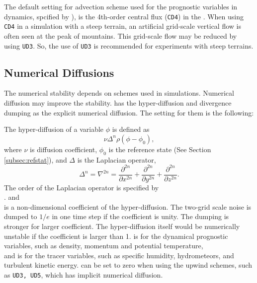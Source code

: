 The default setting for advection scheme used for the prognostic variables in dynamics, spcified by ),
is the 4th-order central flux (\verb|CD4|) in the \scalerm.
When using \verb|CD4| in a simulation with a steep terrain,
an artificial grid-scale vertical flow is often seen at the peak of mountains.
This grid-scale flow may be reduced by using \verb|UD3|.
So, the use of \verb|UD3| is recommended for experiments with steep terrains.


\subsection{Numerical Diffusions} \label{subsec:numdiff}

The numerical stability depends on schemes used in simulations.
Numerical diffusion may improve the stability.
\scalerm has the hyper-diffusion and divergence dumping as the explicit numerical diffusion.
The setting for them is the following:

The hyper-diffusion of a variable $\phi$ is defined as
\begin{equation}
  \nu \Delta^n \rho ( \phi - \phi_0 ),
\end{equation}
where $\nu$ is diffusion coefficient, $\phi_0$ is the reference state (See Section \ref{subsec:refstat}), and $\Delta$ is the Laplacian operator,
\begin{equation}
  \Delta^n = \nabla^{2n} = \frac{\partial^{2n}}{\partial x^{2n}} + \frac{\partial^{2n}}{\partial y^{2n}} + \frac{\partial^{2n}}{\partial z^{2n}}.
\end{equation}
The order of the Laplacian operator is specified by \\
. 
 and \\
 is a non-dimensional coefficient of the hyper-diffusion.
The two-grid scale noise is dumped to $1/e$ in one time step if the coefficient is unity.
The dumping is stronger for larger coefficient.
The hyper-diffusion itself would be numerically unstable if the coefficient is larger than 1.
 is for the dynamical prognostic variables, such as density, momentum and potential temperature, \\
and  is for the tracer variables, such as specific humidity, hydrometeors, and turbulent kinetic energy.
 can be set to zero when using the upwind schemes, such as \verb|UD3, UD5|, which has implicit numerical diffusion.


